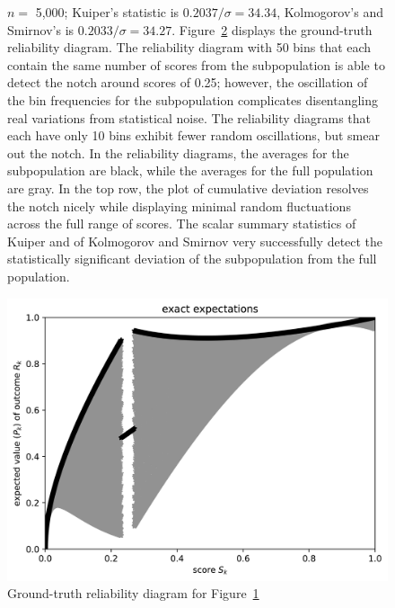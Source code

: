 \documentclass{article}
\begin{document}
\begin{figure}
\begin{centering}
\end{centering}
\caption{$n =$ 5,000;
         Kuiper's statistic is $0.2037 / \sigma = 34.34$,
         Kolmogorov's and Smirnov's is $0.2033 / \sigma = 34.27$.
Figure~\ref{5000e} displays the ground-truth reliability diagram.
The reliability diagram with 50 bins
that each contain the same number of scores from the subpopulation
is able to detect the notch around scores of 0.25;
however, the oscillation of the bin frequencies
for the subpopulation complicates disentangling real variations
from statistical noise. The reliability diagrams that each have only 10 bins
exhibit fewer random oscillations, but smear out the notch.
In the reliability diagrams, the averages for the subpopulation are black,
while the averages for the full population are gray.
In the top row, the plot of cumulative deviation resolves the notch nicely
while displaying minimal random fluctuations across the full range of scores.
The scalar summary statistics of Kuiper and of Kolmogorov and Smirnov
very successfully detect the statistically significant deviation
of the subpopulation from the full population.
}
\label{5000}
\end{figure}

\begin{figure}
\begin{centering}

\parbox{\imsize}{\includegraphics[width=\imsize]
                {./codes/unweighted/50000_5000_10_0/exact.jpg}}

\end{centering}
\caption{Ground-truth reliability diagram for Figure~\ref{5000}}
\label{5000e}
\end{figure}
\end{document}
